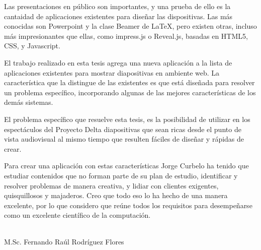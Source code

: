 
\begin{opinion}

    Las presentaciones en público son importantes, y una prueba de ello es la cantaidad de aplicaciones existentes para diseñar las dispositivas.  Las más conocidas son Powerpoint y la clase Beamer de \LaTeX{}, pero existen otras, incluso más impresionantes que ellas, como impress.js o Reveal.js, basadas en HTML5, CSS, y Javascript.   

    El trabajo realizado en esta tesis agrega una nueva aplicación a la lista de aplicaciones existentes para mostrar diapositivas en ambiente web.  La característica que la distingue de las existentes es que está diseñada para resolver un problema específico, incorporando algunas de las mejores características de los demás sistemas.

    El problema específico que resuelve esta tesis, es la posibilidad de utilizar en los espectáculos del Proyecto Delta diapositivas que sean ricas desde el punto de vista audiovisual al mismo tiempo que resulten fáciles de diseñar y rápidas de crear.

    Para crear una aplicación con estas características Jorge Curbelo ha tenido que estudiar contenidos que no forman parte de su plan de estudio, identificar y resolver problemas de manera creativa, y lidiar con clientes exigentes, quisquillosos y majaderos.  Creo que todo eso lo ha hecho de una manera excelente, por lo que considero que reúne todos los requisitos para desempeñarse como un excelente científico de la computación.


\vfill
\begin{flushright}
\underline{\hspace{186pt}}\hfill \\
M.Sc. Fernando Ra\'ul Rodríguez Flores
\end{flushright}
\end{opinion}
